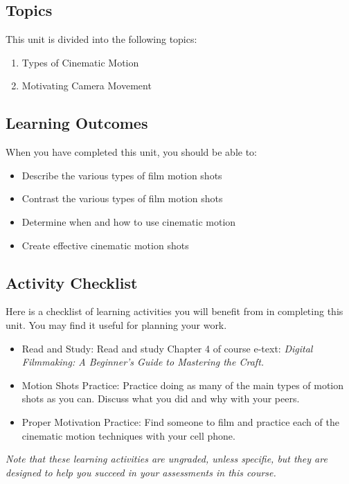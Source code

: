 \documentclass[
]{book}
\providecommand{\tightlist}{%
  \setlength{\itemsep}{0pt}\setlength{\parskip}{0pt}}
\begin{document}
\hypertarget{topics-3}{%
\subsection*{Topics}\label{topics-3}}

This unit is divided into the following topics:

\begin{enumerate}
\def\labelenumi{\arabic{enumi}.}
\tightlist
\item
  Types of Cinematic Motion\\
\item
  Motivating Camera Movement
\end{enumerate}

\hypertarget{learning-outcomes-3}{%
\subsection*{Learning Outcomes}\label{learning-outcomes-3}}

When you have completed this unit, you should be able to:

\begin{itemize}
\tightlist
\item
  Describe the various types of film motion shots
\item
  Contrast the various types of film motion shots
\item
  Determine when and how to use cinematic motion
\item
  Create effective cinematic motion shots
\end{itemize}

\hypertarget{activity-checklist-3}{%
\subsection*{Activity Checklist}\label{activity-checklist-3}}

\begin{reflect}
Here is a checklist of learning activities you will benefit from in completing this unit. You may find it useful for planning your work.

\begin{itemize}
\tightlist
\item
  Read and Study: Read and study Chapter 4 of course e-text: \emph{Digital Filmmaking: A Beginner's Guide to Mastering the Craft.}
\item
  Motion Shots Practice: Practice doing as many of the main types of motion shots as you can. Discuss what you did and why with your peers.
\item
  Proper Motivation Practice: Find someone to film and practice each of the cinematic motion techniques with your cell phone.
\end{itemize}

\emph{Note that these learning activities are ungraded, unless specifie, but they are designed to help you succeed in your assessments in this course.}
\end{reflect}
\end{document}
